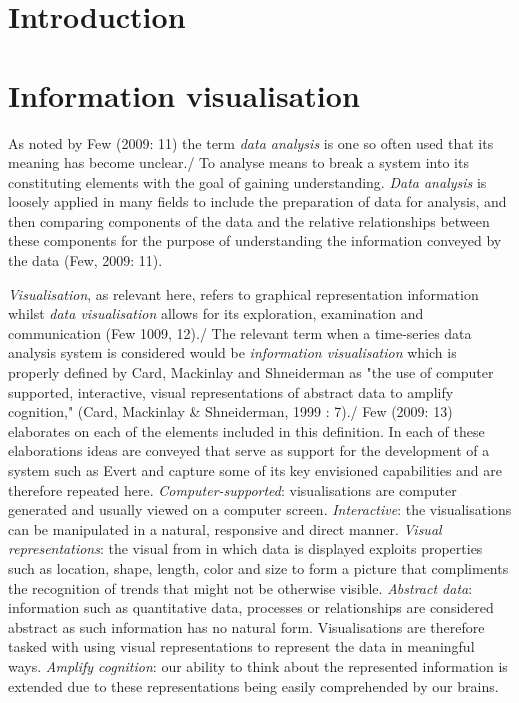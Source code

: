 \documentclass[12pt, a4paper]{report}
\begin{document}
\section{Introduction}

\section{Information visualisation}
As noted by Few (2009: 11) the term \emph{data analysis} is one so often used that its meaning has become unclear./
To analyse means to break a system into its constituting elements with the goal of gaining understanding.
\emph{Data analysis} is loosely applied in many fields to include the preparation of data for analysis, and then comparing components
of the data and the relative relationships between these components for the purpose of understanding the information conveyed by the data (Few, 2009: 11).

\emph{Visualisation}, as relevant here, refers to graphical representation information whilst
 \emph{data visualisation} allows for its exploration, examination and communication (Few 1009, 12)./
 The relevant term when a time-series data analysis system is considered would be \emph{information visualisation}
 which is properly defined by Card, Mackinlay and Shneiderman as "the use of computer supported,
 interactive, visual representations of abstract data to amplify cognition," (Card, Mackinlay & Shneiderman, 1999 : 7)./
 Few (2009: 13) elaborates on each of the elements included in this definition.
 In each of these elaborations ideas are conveyed that serve as support for the development of a system such as Evert and 
 capture some of its key envisioned capabilities and are therefore repeated here.
 	\emph{Computer-supported}: visualisations are computer generated and usually viewed on a computer screen.
	\emph{Interactive}: the visualisations can be manipulated in a natural, responsive and direct manner.
	\emph{Visual representations}: the visual from in which data is displayed exploits properties such as location,
        shape, length, color and size to form a picture that compliments the recognition of trends that might not be otherwise
        visible.
	\emph{Abstract data}: information such as quantitative data, processes or relationships are considered abstract as
        such information has no natural form.
        Visualisations are therefore tasked with using visual representations to represent the data in meaningful ways.
	\emph{Amplify cognition}: our ability to think about the represented information is extended
        due to these representations being easily comprehended by our brains.
	
\end{document}
